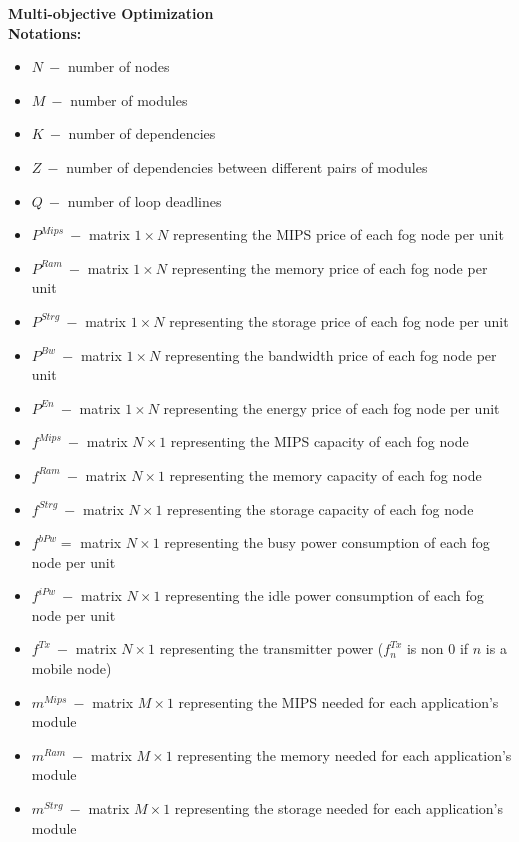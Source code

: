 \documentclass{article}
\begin{document}
\newcommand{\SubItem}[1]{
    {\setlength\itemindent{15pt} \item[-] #1}
}

\noindent\textbf{Multi-objective Optimization}\\[6pt]
\noindent\textbf{Notations:}
\begin{itemize}
	\item $N~-$ number of nodes
	\item $M~-$ number of modules
	\item $K~-$ number of dependencies
	\item $Z~-$ number of dependencies between different pairs of modules
	\item $Q~-$ number of loop deadlines\\
	
	\item $P^{Mips}~-$ matrix $1\times N$ representing the MIPS price of each fog node per unit
	\item $P^{Ram}~-$ matrix $1\times N$ representing the memory price of each fog node per unit
	\item $P^{Strg}~-$ matrix $1\times N$ representing the storage price of each fog node per unit
	\item $P^{Bw}~-$ matrix $1\times N$ representing the bandwidth price of each fog node per unit
	\item $P^{En}~-$ matrix $1\times N$ representing the energy price of each fog node per unit\\
	
	\item $f^{Mips}~-$ matrix $N\times 1$ representing the MIPS capacity of each fog node
	\item $f^{Ram}~-$ matrix $N\times 1$ representing the memory capacity of each fog node
	\item $f^{Strg}~-$ matrix $N\times 1$ representing the storage capacity of each fog node
	\item $f^{bPw}=$ matrix $N\times 1$ representing the busy power consumption of each fog node per unit
	\item $f^{iPw}~-$ matrix $N\times 1$ representing the idle power consumption of each fog node per unit
	\item $f^{Tx}~-$ matrix $N\times 1$ representing the transmitter power ($f^{Tx}_n$ is non 0 if $n$ is a mobile node)\\
	
	\item $m^{Mips}~-$ matrix $M\times 1$ representing the MIPS needed for each application's module
	\item $m^{Ram}~-$ matrix $M\times 1$ representing the memory needed for each application's module
	\item $m^{Strg}~-$ matrix $M\times 1$ representing the storage needed for each application's module\\
	

\end{itemize}
\end{document}
